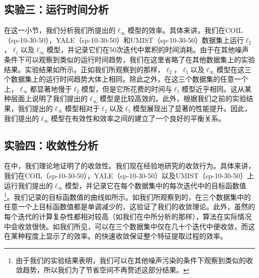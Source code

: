 \subsection{实验三：运行时间分析}
在这一小节，我们分析我们所提出的$\ell_{\infty}$模型的效率。具体来讲，我们在COIL（sp-10-30-50），YALE（sp-10-30-50）和UMIST（sp-10-30-50）数据集上运行$\ell_{2}$，$\ell_{1}$以及$\ell_{\infty}$模型，并记录它们在50次迭代中累积的时间消耗。由于在其他噪声条件下可以观察到类似的运行时间趋势，我们在这里省略了在其他数据集上的实验结果。实验结果如所示。正如我们所观察到的那样，$\ell_{2}$，$\ell_{1}$以及$\ell_{\infty}$模型在这三个数据集上的运行时间趋势大体上相同。除此之外，在这三个数据集的任意一个上，$\ell_{\infty}$都显著地慢于$\ell_{2}$模型，但是它所花费的时间与$\ell_{1}$模型近乎相同。这从某种层面上说明了我们提出的$\ell_{\infty}$模型是比较高效的。此外，根据我们之前的实验结果，我们提出的$\ell_{\infty}$模型相对于$\ell_{2}$以及$\ell_{1}$模型展现出了显著的性能提升。因此，我们提出的$\ell_{\infty}$模型在有效性和效率之间的建立了一个良好的平衡关系。

\subsection{实验四：收敛性分析}
在中，我们理论地证明了的收敛性。我们现在经验地研究的收敛行为。具体来讲，我们在COIL（sp-10-30-50），YALE（sp-10-30-50）以及UMIST（sp-10-30-50）上运行我们提出的$\ell_{\infty}$模型，并记录它在每个数据集中的每次迭代中的目标函数值\footnote{由于我们的实验结果表明，我们可以在其他噪声污染的条件下观察到类似的收敛趋势，所以我们为了节省空间不再赘述这部分结果。}。我们记录的目标函数值的曲线如所示。如我们所观察到的，在三个数据集中的任意一个上目标函数值都是单调减少的，这验证了我们的收敛理论。此外，虽然的每个迭代的计算复杂性都相对较高（如我们在中所分析的那样），算法在实际情况中会收敛很快。如我们所见，可以在三个数据集中仅在几十个迭代中便收敛，而这在某种程度上显示了的效率。的快速收敛保证整个特征提取过程的效率。

